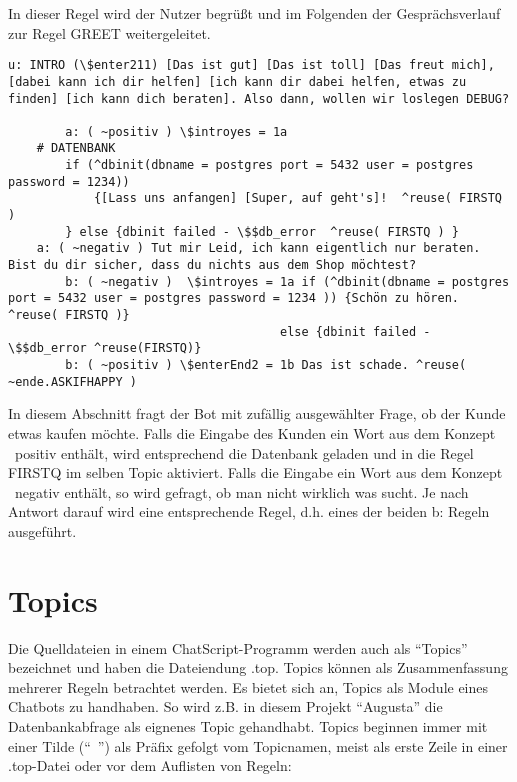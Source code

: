 In dieser Regel wird der Nutzer begrüßt und im Folgenden der Gesprächsverlauf zur Regel GREET weitergeleitet.

\begin{lstlisting}[caption={Beispiel für Gesprächsablauf mit Antworten u:, a: und b:}]
 u: INTRO (\$enter211) [Das ist gut] [Das ist toll] [Das freut mich], [dabei kann ich dir helfen] [ich kann dir dabei helfen, etwas zu finden] [ich kann dich beraten]. Also dann, wollen wir loslegen DEBUG?

		a: ( ~positiv ) \$introyes = 1a
	# DATENBANK
	    if (^dbinit(dbname = postgres port = 5432 user = postgres password = 1234))
	        {[Lass uns anfangen] [Super, auf geht's]!  ^reuse( FIRSTQ )
	    } else {dbinit failed - \$$db_error  ^reuse( FIRSTQ ) }
	a: ( ~negativ ) Tut mir Leid, ich kann eigentlich nur beraten. Bist du dir sicher, dass du nichts aus dem Shop möchtest?
		b: ( ~negativ )  \$introyes = 1a if (^dbinit(dbname = postgres port = 5432 user = postgres password = 1234 )) {Schön zu hören. ^reuse( FIRSTQ )}
                                      else {dbinit failed - \$$db_error ^reuse(FIRSTQ)}
	    b: ( ~positiv ) \$enterEnd2 = 1b Das ist schade. ^reuse( ~ende.ASKIFHAPPY )
\end{lstlisting}

In diesem Abschnitt fragt der Bot mit zufällig ausgewählter Frage, ob der Kunde etwas kaufen möchte. Falls die Eingabe des Kunden ein Wort aus dem Konzept ~positiv enthält, wird entsprechend die Datenbank geladen und in die Regel FIRSTQ im selben Topic aktiviert. Falls die Eingabe ein Wort aus dem Konzept ~negativ enthält, so wird gefragt, ob man nicht wirklich was sucht. Je nach Antwort darauf wird eine entsprechende Regel, d.h. eines der beiden b: Regeln ausgeführt. 


\section{Topics}
\label{sec:ChatScript: Topics}

Die Quelldateien in einem ChatScript-Programm werden auch als "`Topics"' bezeichnet und haben die Dateiendung .top. Topics können als Zusammenfassung mehrerer Regeln betrachtet werden. Es bietet sich an, Topics als Module eines Chatbots zu handhaben. So wird z.B. in diesem Projekt "`Augusta"' die Datenbankabfrage als eignenes Topic gehandhabt.
Topics beginnen immer mit einer Tilde ("`~"') als Präfix gefolgt vom Topicnamen, meist als erste Zeile in einer .top-Datei oder vor dem Auflisten von Regeln:

